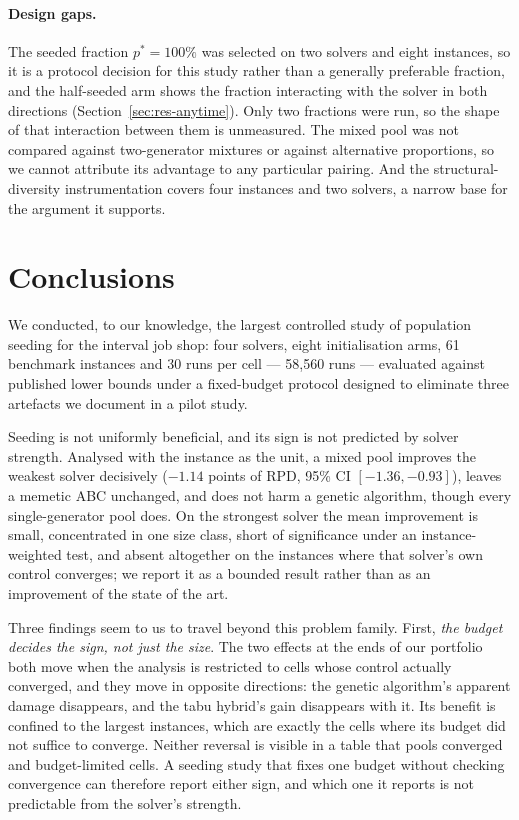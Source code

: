 \documentclass[review]{elsarticle}
\begin{document}
\paragraph{Design gaps.} The seeded fraction $p^{*}=100\%$ was selected on
two solvers and eight instances, so it is a protocol decision for this
study rather than a generally preferable fraction, and the half-seeded arm
shows the fraction interacting with the solver in both directions
(Section~\ref{sec:res-anytime}). Only two fractions were run, so the shape
of that interaction between them is unmeasured.
The mixed pool was not compared against two-generator mixtures or against
alternative proportions, so we cannot attribute its advantage to any
particular pairing. And the structural-diversity instrumentation covers
four instances and two solvers, a narrow base for the argument it supports.

\section{Conclusions}\label{sec:conclusions}

We conducted, to our knowledge, the largest controlled study of population
seeding for the interval job shop: four solvers, eight initialisation arms,
61 benchmark instances and 30 runs per cell --- 58{,}560 runs --- evaluated
against published lower bounds under a fixed-budget protocol designed to
eliminate three artefacts we document in a pilot study.

Seeding is not uniformly beneficial, and its sign is not predicted by
solver strength. Analysed with the instance as the unit, a mixed pool
improves the weakest solver decisively ($-1.14$ points of RPD, 95\% CI
$[-1.36,-0.93]$), leaves a memetic ABC unchanged, and does not harm a
genetic algorithm, though every single-generator pool does. On the
strongest solver the mean improvement is small, concentrated in one size
class, short of significance under an instance-weighted test, and absent
altogether on the instances where that solver's own control converges; we
report it as a bounded result rather than as an improvement of the state
of the art.

Three findings seem to us to travel beyond this problem family. First,
\emph{the budget decides the sign, not just the size}. The two effects at
the ends of our portfolio both move when the analysis is restricted to
cells whose control actually converged, and they move in opposite
directions: the genetic algorithm's apparent damage disappears, and the
tabu hybrid's gain disappears with it. Its benefit is confined to the
largest instances, which are exactly the cells where its budget did not
suffice to converge. Neither reversal is visible in a table that pools
converged and budget-limited cells. A seeding study that fixes one budget
without checking convergence can therefore report either sign, and which
one it reports is not predictable from the solver's strength.
\end{document}
